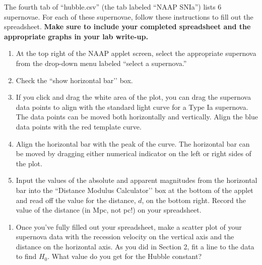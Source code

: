 \documentclass[11pt]{article}
\begin{document}
\medskip \noindent
The fourth tab of ``hubble.csv'' (the tab labeled ``NAAP SNIa'') lists 6 supernovae. For each of these supernovae, follow these instructions to fill out the spreadsheet.  \textbf{Make sure to include your completed spreadsheet and the appropriate graphs in your lab write-up.}
\begin{enumerate}[label=Step \arabic*:]
    \item At the top right of the NAAP applet screen, select the appropriate supernova from the drop-down menu labeled ``select a supernova.''
    
    \item Check the ``show horizontal bar'’ box.
    
    \item If you click and drag the white area of the plot, you can drag the supernova data points to align with the standard light curve for a Type Ia supernova. The data points can be moved both horizontally and vertically. Align the blue data points with the red template curve.
    
    \item Align the horizontal bar with the peak of the curve. The horizontal bar can be moved by dragging either numerical indicator on the left or right sides of the plot.
    
    \item Input the values of the absolute and apparent magnitudes from the horizontal bar into the ``Distance Modulus Calculator'’ box at the bottom of the applet and read off the value for the distance, $d$, on the bottom right. Record the value of the distance (in Mpc, not pc!) on your spreadsheet.
    
\end{enumerate} 

\begin{enumerate}
    \item Once you've fully filled out your spreadsheet, make a scatter plot of your supernova data with the recession velocity on the vertical axis and the distance on the horizontal axis. As you did in Section 2, fit a line to the data to find $H_0$. What value do you get for the Hubble constant?
\end{enumerate}
\end{document}
